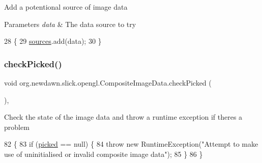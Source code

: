 Add a potentional source of image data


\begin{DoxyParams}{Parameters}
{\em data} & The data source to try \\
\hline
\end{DoxyParams}

\begin{DoxyCode}
28                                             \{
29         \mbox{\hyperlink{classorg_1_1newdawn_1_1slick_1_1opengl_1_1_composite_image_data_a620f0a2292b907b7a3418d95d91e422c}{sources}}.add(data);
30     \}
\end{DoxyCode}
\mbox{\label{classorg_1_1newdawn_1_1slick_1_1opengl_1_1_composite_image_data_a1a95487f3cd09ae6bf1458ffa1d433b8}} 
\subsubsection{\texorpdfstring{check\+Picked()}{checkPicked()}}
{\footnotesize\ttfamily void org.\+newdawn.\+slick.\+opengl.\+Composite\+Image\+Data.\+check\+Picked (\begin{DoxyParamCaption}{ }\end{DoxyParamCaption})\hspace{0.3cm}{\ttfamily [inline]}, {\ttfamily [private]}}

Check the state of the image data and throw a runtime exception if theres a problem 
\begin{DoxyCode}
82                                \{
83         \textcolor{keywordflow}{if} (\mbox{\hyperlink{classorg_1_1newdawn_1_1slick_1_1opengl_1_1_composite_image_data_a7238cbb20cc08b68a29935b4bc222da7}{picked}} == null) \{
84             \textcolor{keywordflow}{throw} \textcolor{keyword}{new} RuntimeException(\textcolor{stringliteral}{"Attempt to make use of uninitialised or invalid composite image
       data"});
85         \}
86     \}
\end{DoxyCode}
\mbox{\label{classorg_1_1newdawn_1_1slick_1_1opengl_1_1_composite_image_data_a9f2859d594b5040ea7ab930f194412ac}} 

